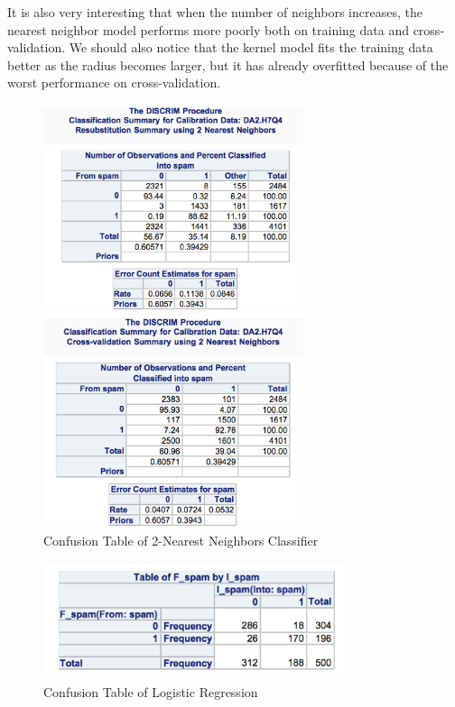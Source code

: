 \documentclass[letterpaper, 12pt]{article}
\begin{document}
It is also very interesting that when the number of neighbors increases, the nearest neighbor model performs more poorly both on training data and cross-validation. We should also notice that the kernel model fits the  training data better as the radius becomes larger, but it has already overfitted because of the worst performance on cross-validation. \begin{figure}[htbp]
\begin{minipage}[t]{0.5\linewidth}
\centering
\includegraphics[width=3in]{7-15.eps}
\end{minipage}
\begin{minipage}[t]{0.5\linewidth}
\centering
\includegraphics[width=3in]{7-16.eps}
\end{minipage}
\caption{Confusion Table of 2-Nearest Neighbors Classifier}\label{t1}
\end{figure}
\begin{figure}[htbp]
\centering\includegraphics[width=3.5in]{7-25.eps}
\caption{Confusion Table of Logistic Regression}\label{t6}
\end{figure}
\end{document}
